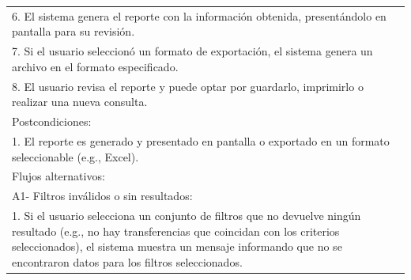 \documentclass[stu, 12pt, letterpaper, donotrepeattitle, floatsintext, natbib]{apa7}
\begin{document}
\begin{longtable}{@{} p{16.5cm} @{}}
    6. El sistema genera el reporte con la información obtenida, presentándolo en pantalla para su revisión.                                                                                                                                                                          \\
    7. Si el usuario seleccionó un formato de exportación, el sistema genera un archivo en el formato especificado.                                                                                                                                                                   \\
    8. El usuario revisa el reporte y puede optar por guardarlo, imprimirlo o realizar una nueva consulta.                                                                                                                                                                            \\ \midrule
    Postcondiciones:                                                                                                                                                                                                                                                                  \\
    1. El reporte es generado y presentado en pantalla o exportado en un formato seleccionable (e.g., Excel).                                                                                                                                                                         \\ \midrule
    Flujos alternativos:                                                                                                                                                                                                                                                              \\
    A1- Filtros inválidos o sin resultados:                                                                                                                                                                                                                                           \\
    \hspace{1cm}1. Si el usuario selecciona un conjunto de filtros que no devuelve ningún resultado (e.g., no hay transferencias que coincidan con los criterios seleccionados), el sistema muestra un mensaje informando que no se encontraron datos para los filtros seleccionados. \\

\end{longtable}
\end{document}
